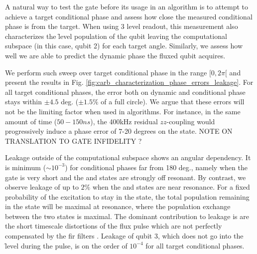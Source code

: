 A natural way to test the gate before its usage in an algorithm is to attempt to achieve a target conditional phase and assess how close the measured conditional phase is from the target. When using 3 level readout, this measurement also characterizes the \f level population of the qubit leaving the computational subspace (in this case, qubit 2) for each target angle. Similarly, we assess how well we are able to predict the dynamic phase the fluxed qubit acquires.

We perform such sweep over target conditional phase in the range $[0, 2\pi[$ and present the results in Fig. \ref{fig:carb_characterization_phase_errors_leakage}. For all target conditional phases, the error both on dynamic and conditional phase stays within $\pm 4.5$ deg. ($\pm 1.5 \%$ of a full circle). We argue that these errors will not be the limiting factor when used in algorithms. For instance, in the same amount of time ($50-150 \unit{ns}$), the 400\unit{kHz} residual $zz$-coupling would progressively induce a phase error of 7-20 degrees on the \oo state.   NOTE ON TRANSLATION TO GATE INFIDELITY ?

Leakage outside of the computational subspace shows an angular dependency. It is minimum ($\sim 10^{-3}$) for conditional phases far from 180 deg., namely when the gate is very short and the \oo and \tz states are strongly off resonant. By contrast, we observe leakage of up to $2\%$ when the \oo and \tz states are near resonance. For a fixed probability of the excitation to stay in the \tz state, the total population remaining in the \tz state will be maximal at resonance, where the population exchange between the two states is maximal. The dominant contribution to leakage is are the short timescale distortions of the flux pulse \cite{Rol2019Time-domainProcessor} which are not perfectly compensated by the \gls{fir} filters \cite{Butscher2018ShapingFiltering}.  Leakage of qubit 3, which does not go into the \f level during the pulse, is on the order of $10^{-4}$ for all target conditional phases.

